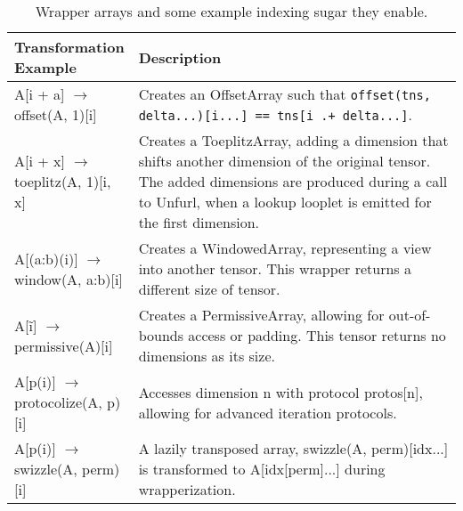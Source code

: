     \begin{table}[h]
        \scriptsize
        \centering
        \begin{tabular}{|>{\raggedright\arraybackslash}m{0.25\linewidth}|>{\raggedright\arraybackslash}m{0.75\linewidth}|}
        \hline
        \textbf{Transformation Example} & \textbf{Description} \\
        \hline
        A[i + a] $\rightarrow$ offset(A, 1)[i] & Creates an OffsetArray such that \texttt{offset(tns, delta...)[i...] == tns[i .+ delta...]}. \\
        \hline
        A[i + x] $\rightarrow$ toeplitz(A, 1)[i, x] & Creates a ToeplitzArray, adding a dimension that shifts another dimension of the original tensor. The added dimensions are produced during a call to Unfurl, when a lookup looplet is emitted for the first dimension. \\
        \hline
        A[(a:b)(i)] $\rightarrow$ window(A, a:b)[i] & Creates a WindowedArray, representing a view into another tensor. This wrapper returns a different size of tensor. \\
        \hline
        A[\~i] $\rightarrow$ permissive(A)[i] & Creates a PermissiveArray, allowing for out-of-bounds access or padding. This tensor returns no dimensions as its size. \\
        \hline
        A[p(i)] $\rightarrow$ protocolize(A, p)[i] & Accesses dimension n with protocol protos[n], allowing for advanced iteration protocols. \\
        \hline
        A[p(i)] $\rightarrow$ swizzle(A, perm)[i] & A lazily transposed array, swizzle(A, perm)[idx...] is transformed to A[idx[perm]...] during wrapperization. \\
        \hline
        \end{tabular}
        \caption{Wrapper arrays and some example indexing sugar they enable.}
    \label{table:wrappers}
    \end{table}

